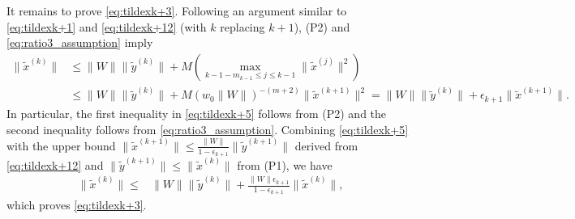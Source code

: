 \documentclass[11pt]{article}
\begin{document}
{{{It remains to prove \eqref{eq:tildexk+3}. Following an  argument similar to  \eqref{eq:tildexk+1} and \eqref{eq:tildexk+12} (with $k$ replacing $k+1$), (P2) and \eqref{eq:ratio3_assumption} imply
\begin{align}\label{eq:tildexk+5}
\|\widetilde{x}^{(k)}\| &\leq \|W\|\|\widetilde{y}^{(k)}\|+M(\max_{k-1-m_{k-1}\leq j\leq k-1}\|\widetilde{x}^{(j)}\|^2) \nonumber \\
&\leq \|W\|\|\widetilde{y}^{(k)}\|+M(w_0\|W\|)^{-(m+2)}\|\widetilde{x}^{(k+1)}\|^2=\|W\|\|\widetilde{y}^{(k)}\|+\epsilon_{k+1}\|\widetilde{x}^{(k+1)}\|. 
\end{align}
In particular, the first inequality in \eqref{eq:tildexk+5} follows from (P2) and the second inequality follows from \eqref{eq:ratio3_assumption}. 
Combining \eqref{eq:tildexk+5} with the upper bound  $\|\widetilde{x}^{(k+1)}\|\leq\frac{\|W\|}{1-\epsilon_{k+1}}\|\widetilde{y}^{(k+1)}\|$ derived from \eqref{eq:tildexk+12} and $\|\widetilde{y}^{(k+1)}\|\leq \|\widetilde{x}^{(k)}\|$ from (P1), we have
\begin{align}\label{eq:tildexk+6}
\|\widetilde{x}^{(k)}\| 
\leq&\|W\|\|\widetilde{y}^{(k)}\|+\frac{\|W\|\epsilon_{k+1}}{1-\epsilon_{k+1}}\|\widetilde{x}^{(k)}\|,
\end{align}
which proves \eqref{eq:tildexk+3}.
}



}}
\end{document}

